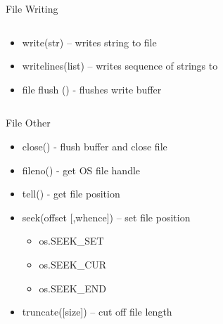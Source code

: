 % 
% 
% 
\begin{Slide}{File Writing}
  \begin{columns}
    \begin{column}{.48\textwidth}
      \begin{itemize}
      \item write(str) – writes string to file
      \item writelines(list) – writes sequence of strings to
      \item file flush () - flushes write buffer
      \end{itemize}
    \end{column}

    \hfill

    \begin{column}{.48\textwidth}

      \pause

      \inputminted[firstline=3,
      lastline=27,
      breaklines,
      fontsize=\tiny,
      bgcolor=Background,
      linenos]{python}{../src/filew.py}
      
    \end{column}
  \end{columns} 
\end{Slide}

% 
% 
% 
\begin{Slide}{File Other}

  \begin{itemize}
  \item close() - flush buffer and close file
  \item fileno() - get OS file handle
  \item tell() - get file position
  \item seek(offset [,whence]) – set file position
    \begin{itemize}
    \item os.SEEK\_SET
    \item os.SEEK\_CUR
    \item os.SEEK\_END
    \end{itemize}
  \item truncate([size]) – cut off file length
  \end{itemize}

\end{Slide}


